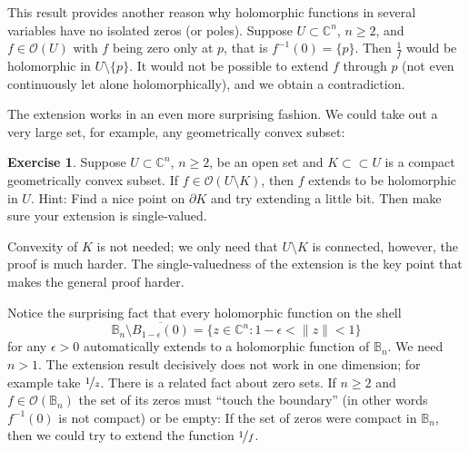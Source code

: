 \documentclass[12pt,openany]{book}
\newcommand{\snorm}[1]{\lVert {#1} \rVert}
\newcommand{\C}{{\mathbb{C}}}
\newcommand{\bB}{{\mathbb{B}}}
\newcommand{\sO}{{\mathscr{O}}}
\theoremstyle{plain}
\theoremstyle{remark}
\theoremstyle{definition}
\newenvironment{exbox}{%
    \def\FrameCommand{\vrule width 1pt \relax\hspace{10pt}}%
    \MakeFramed {\advance \hsize -\width \FrameRestore}%
}{%
    \endMakeFramed
}
\theoremstyle{exercise}
\newtheorem{exercise}{Exercise}[section]
\theoremstyle{example}
\begin{document}
This result provides another reason why holomorphic functions in several
variables have no isolated zeros (or poles).  Suppose $U \subset \C^n$,
$n \geq 2$, and $f \in \sO(U)$ with $f$ being zero only at $p$, that
is $f^{-1}(0) = \{ p \}$.  Then $\frac{1}{f}$ would be holomorphic in
$U \setminus \{ p \}$.  It would not be possible to extend $f$
through $p$ (not even continuously let alone holomorphically),
and we obtain a contradiction.

The extension works in an even more surprising fashion.  We could
take out a very large set, for example, any geometrically
convex subset:

\begin{exbox}
\begin{exercise} \label{exercise:convexhartogs}
Suppose $U \subset \C^n$, $n \geq 2$, be an open set and $K \subset \subset U$
is a compact geometrically
convex subset.
If $f \in \sO(U \setminus K)$,
then $f$ extends to be holomorphic in $U$.
Hint: Find a nice point on $\partial K$ and try extending a little bit.
Then make sure your extension is single-valued.
\end{exercise}
\end{exbox}

Convexity of $K$ is not needed; we only need that $U\setminus K$
is connected, however, the proof is much harder.
The single-valuedness of the extension is the key point that makes the
general proof harder.

Notice the surprising fact that every holomorphic function on
the shell
\begin{equation*}
\bB_n \setminus \overline{B_{1-\epsilon}(0)} =
\bigl\{ z \in \C^n : 1-\epsilon < \snorm{z} < 1 \bigr\}
\end{equation*}
for any $\epsilon > 0$ automatically
extends to a holomorphic function of $\bB_n$.  We need $n > 1$.
The extension result decisively does not work in one dimension; for
example take $\nicefrac{1}{z}$.
There is a related fact about zero sets.
If $n \geq 2$ and $f \in \sO(\bB_n)$
the set of its zeros must 
``touch the boundary'' (in other words $f^{-1}(0)$ is not compact)
or be empty:  If the set of zeros were 
compact in $\bB_n$, then we could try to
extend the function $\nicefrac{1}{f}$.
\end{document}
